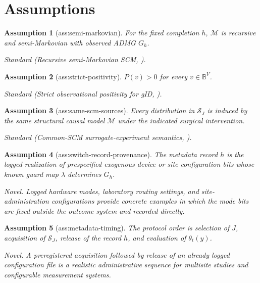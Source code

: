 \documentclass{article}
\newtheorem{assumption}{Assumption}
\begin{document}
\section{Assumptions}

\begin{assumption}[ass:semi-markovian]\label{ass:semi-markovian}
For the fixed completion \(h\), \(\mathcal M\) is recursive and semi-Markovian with observed ADMG \(G_h\).
\par\smallskip\noindent\emph{Standard} (Recursive semi-Markovian SCM, \cite{shpitserpearl2006}).
\end{assumption}

\begin{assumption}[ass:strict-positivity]\label{ass:strict-positivity}
\(P(v)>0\) for every \(v\in\mathbb B^V\).
\par\smallskip\noindent\emph{Standard} (Strict observational positivity for gID, \cite{kivva2022revisiting}).
\end{assumption}

\begin{assumption}[ass:same-scm-sources]\label{ass:same-scm-sources}
Every distribution in \(\mathcal S_J\) is induced by the same structural causal model \(\mathcal M\) under the indicated surgical intervention.
\par\smallskip\noindent\emph{Standard} (Common-SCM surrogate-experiment semantics, \cite{lee2020general}).
\end{assumption}

\begin{assumption}[ass:switch-record-provenance]\label{ass:switch-record-provenance}
The metadata record \(h\) is the logged realization of prespecified exogenous device or site configuration bits whose known guard map \(\lambda\) determines \(G_h\).
\par\smallskip\noindent\emph{Novel.} Logged hardware modes, laboratory routing settings, and site-administration configurations provide concrete examples in which the mode bits are fixed outside the outcome system and recorded directly.
\end{assumption}

\begin{assumption}[ass:metadata-timing]\label{ass:metadata-timing}
The protocol order is selection of \(J\), acquisition of \(\mathcal S_J\), release of the record \(h\), and evaluation of \(\theta_t(y)\).
\par\smallskip\noindent\emph{Novel.} A preregistered acquisition followed by release of an already logged configuration file is a realistic administrative sequence for multisite studies and configurable measurement systems.
\end{assumption}
\end{document}
